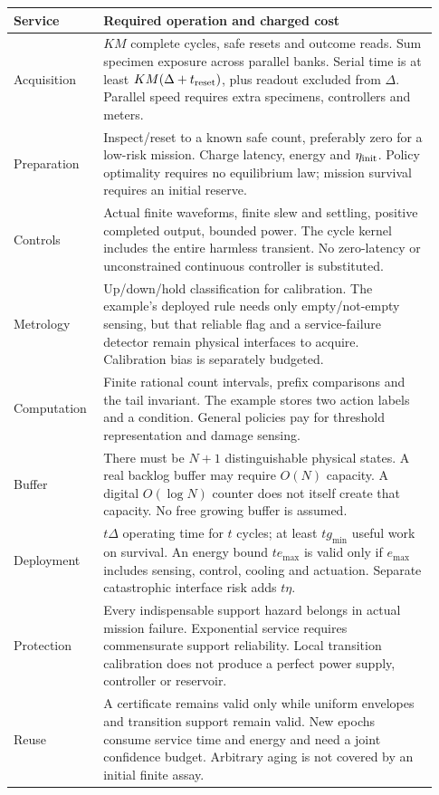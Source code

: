 \documentclass[10pt,a4paper]{article}
\begin{document}
\begin{longtable}{p{0.18\linewidth}p{0.75\linewidth}}
\toprule Service & Required operation and charged cost\\\midrule\endhead
Acquisition & $KM$ complete cycles, safe resets and outcome reads. Sum specimen exposure across parallel banks. Serial time is at least $KM(\Delta+t_{\rm reset})$, plus readout excluded from $\Delta$. Parallel speed requires extra specimens, controllers and meters.\\
Preparation & Inspect/reset to a known safe count, preferably zero for a low-risk mission. Charge latency, energy and $\eta_{\rm init}$. Policy optimality requires no equilibrium law; mission survival requires an initial reserve.\\
Controls & Actual finite waveforms, finite slew and settling, positive completed output, bounded power. The cycle kernel includes the entire harmless transient. No zero-latency or unconstrained continuous controller is substituted.\\
Metrology & Up/down/hold classification for calibration. The example's deployed rule needs only empty/not-empty sensing, but that reliable flag and a service-failure detector remain physical interfaces to acquire. Calibration bias is separately budgeted.\\
Computation & Finite rational count intervals, prefix comparisons and the tail invariant. The example stores two action labels and a condition. General policies pay for threshold representation and damage sensing.\\
Buffer & There must be $N+1$ distinguishable physical states. A real backlog buffer may require $O(N)$ capacity. A digital $O(\log N)$ counter does not itself create that capacity. No free growing buffer is assumed.\\
Deployment & $t\Delta$ operating time for $t$ cycles; at least $t g_{\min}$ useful work on survival. An energy bound $te_{\max}$ is valid only if $e_{\max}$ includes sensing, control, cooling and actuation. Separate catastrophic interface risk adds $t\eta$.\\
Protection & Every indispensable support hazard belongs in actual mission failure. Exponential service requires commensurate support reliability. Local transition calibration does not produce a perfect power supply, controller or reservoir.\\
Reuse & A certificate remains valid only while uniform envelopes and transition support remain valid. New epochs consume service time and energy and need a joint confidence budget. Arbitrary aging is not covered by an initial finite assay.\\\bottomrule
\end{longtable}
\end{document}
